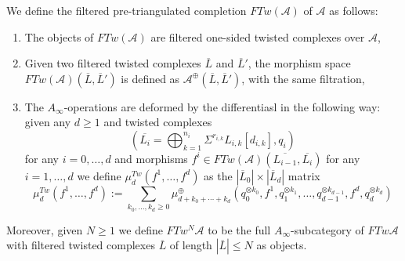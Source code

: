 \begin{dfn}
	We define the filtered pre-triangulated completion $FTw(\mathcal{A})$ of $\mathcal{A}$ as follows:
	\begin{enumerate}
		\item The objects of $FTw(\mathcal{A})$ are filtered one-sided twisted complexes over $\mathcal{A}$,
		\item Given two filtered twisted complexes $\overline{L}$ and $\overline{L}'$, the morphism space $FTw(\mathcal{A})(\overline{L},\overline{L}')$ is defined as $\mathcal{A}^\oplus(\overline{L},\overline{L}')$, with the same filtration, %
		\item The $A_\infty$-operations are deformed by the differentiasl in the following way: given any $d\geq 1$ and twisted complexes $$\left(\overline{L_i} = \bigoplus_{k=1}^{n_i}\Sigma^{r_{i,k}}L_{i,k}[d_{i,k}],q_i\right)$$ for any $i=0,\ldots, d$ and morphisms $f^i\in FTw(\mathcal{A})(\overline{L_{i-1}},\overline{L_i})$ for any $i=1,\ldots, d$ we define $\mu_d^{Tw}(f^1,\ldots, f^d)$ as the $|\overline{L}_0|\times |\overline{L}_d|$ matrix  $$\mu_d^{Tw}(f^1,\ldots, f^d) := \sum_{k_0,\ldots, k_d\geq 0}\mu_{d+k_0+\cdots + k_d}^{\oplus}\left(q_0^{\otimes k_0}, f^1,q_1^{\otimes k_1},\ldots, q_{d-1}^{\otimes k_{d-1}},f^d, q_d^{\otimes k_d}\right)$$
	\end{enumerate}
	Moreover, given $N\geq 1$ we define $FTw^N\mathcal{A}$ to be the full $A_\infty$-subcategory of $FTw\mathcal{A}$ with filtered twisted complexes $\overline{L}$ of length $|\overline{L}|\leq N$ as objects.
\end{dfn}
